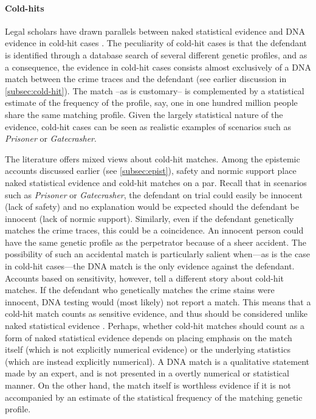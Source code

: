 \documentclass{article}
\begin{document}
\paragraph{Cold-hits}

Legal scholars have drawn parallels between naked statistical evidence and DNA evidence in cold-hit cases  \citep{ Roth2010}. 
The peculiarity of cold-hit cases  is that the defendant is identified through a database search of several different genetic profiles, and as a consequence, the evidence in cold-hit cases consists almost exclusively of a DNA match between the crime traces and the defendant (see earlier discussion in \ref{subsec:cold-hit}). The match --as is customary-- is complemented by a statistical estimate of the frequency of the profile, say, one in one hundred million people share the same matching profile. Given the largely statistical nature of the evidence, cold-hit cases can be seen as realistic examples of  scenarios such as \textit{Prisoner} or \textit{Gatecrasher}.

The literature offers 
mixed views about cold-hit matches. 
Among the epistemic accounts discussed earlier (see \ref{subsec:epist}), safety and normic support place naked statistical evidence and cold-hit matches on a par. Recall that in scenarios such as \textit{Prisoner} or \textit{Gatecrasher}, the defendant on trial could easily be innocent (lack of safety) and no explanation would be expected should the defendant be innocent (lack of normic support). 
Similarly, even if the defendant genetically matches the crime traces, this could be a coincidence. An innocent person could have the same genetic profile as the perpetrator because of a sheer accident. The possibility of such an accidental match is particularly  salient when---as is the case in cold-hit cases---the DNA match is the only evidence against the defendant. %
Accounts based on sensitivity, however,  tell a different story about cold-hit matches. If the defendant who genetically matches the crime stains were innocent, DNA testing would (most likely) not  report a match. This means that a cold-hit match  counts as sensitive evidence, and thus should be considered unlike naked statistical evidence \citep{enoch2015sense}.
Perhaps, whether cold-hit matches should count as a form of naked statistical evidence depends on placing emphasis on the match itself (which is not explicitly numerical evidence) or the underlying statistics (which are instead explicitly numerical). A DNA match is a qualitative statement made by an expert, and is not presented in a overtly numerical or statistical manner.  On the other hand, the match itself is worthless evidence if it is not accompanied by an estimate of the statistical frequency of the matching genetic profile. 
\end{document}
